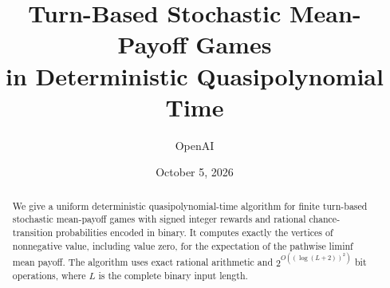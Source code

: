 \documentclass[11pt]{article}
\title{Turn-Based Stochastic Mean-Payoff Games\\in Deterministic Quasipolynomial Time}
\author{OpenAI}
\date{October 5, 2026}
\numberwithin{equation}{section}
\theoremstyle{definition}
\theoremstyle{remark}
\begin{document}
\maketitle
\begin{abstract}
We give a uniform deterministic quasipolynomial-time algorithm for finite
turn-based stochastic mean-payoff games with signed integer rewards and
rational chance-transition probabilities encoded in binary. It computes
exactly the vertices of nonnegative value, including value zero, for the
expectation of the pathwise liminf mean payoff. The algorithm uses exact
rational arithmetic and $2^{O((\log(L+2))^2)}$ bit operations, where $L$
is the complete binary input length.
\end{abstract}




\begingroup
\small
\setlength{\bibsep}{5pt}


\endgroup
\end{document}
